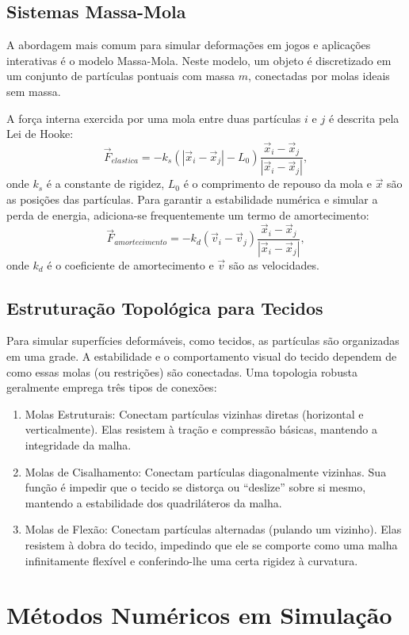 \subsection*{Sistemas Massa-Mola}

A abordagem mais comum para simular deformações em jogos e aplicações interativas é o modelo Massa-Mola. Neste modelo, um objeto é discretizado em um conjunto de partículas pontuais com massa $m$, conectadas por molas ideais sem massa.

A força interna exercida por uma mola entre duas partículas $i$ e $j$ é descrita pela Lei de Hooke:
$$
	\vec F_{elastica} = -k_s (|\vec x_i - \vec x_j| - L_0) \frac{\vec x_i - \vec x_j}{|\vec x_i - \vec x_j|},
$$
onde $k_s$ é a constante de rigidez, $L_0$ é o comprimento de repouso da mola e $\vec x$ são as posições das partículas. Para garantir a estabilidade numérica e simular a perda de energia, adiciona-se frequentemente um termo de amortecimento:
$$
	\vec F_{amortecimento} = -k_d (\vec v_i - \vec v_j) \frac{\vec x_i - \vec x_j}{|\vec x_i - \vec x_j|},
$$
onde $k_d$ é o coeficiente de amortecimento e $\vec v$ são as velocidades.

\subsection*{Estruturação Topológica para Tecidos}

Para simular superfícies deformáveis, como tecidos, as partículas são organizadas em uma grade. A estabilidade e o comportamento visual do tecido dependem de como essas molas (ou restrições) são conectadas. Uma topologia robusta geralmente emprega três tipos de conexões:
\begin{enumerate}
	\item Molas Estruturais: Conectam partículas vizinhas diretas (horizontal e verticalmente). Elas resistem à tração e compressão básicas, mantendo a integridade da malha.
	\item Molas de Cisalhamento: Conectam partículas diagonalmente vizinhas. Sua função é impedir que o tecido se distorça ou ``deslize'' sobre si mesmo, mantendo a estabilidade dos quadriláteros da malha.
	\item Molas de Flexão: Conectam partículas alternadas (pulando um vizinho). Elas resistem à dobra do tecido, impedindo que ele se comporte como uma malha infinitamente flexível e conferindo-lhe uma certa rigidez à curvatura.
\end{enumerate}

\section{Métodos Numéricos em Simulação}

